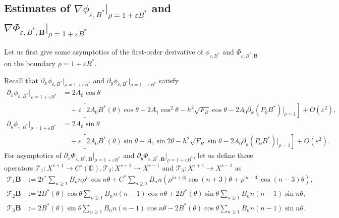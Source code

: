 \documentclass[12pt,reqno]{amsart}
\numberwithin{equation}{section}
\theoremstyle{definition}
\theoremstyle{remark}
\begin{document}
\subsection{Estimates of $  \nabla\phi_{\varepsilon,B^*}\big|_{\rho=1+\varepsilon B^*} $  and  $\nabla\Phi_{\varepsilon, B^*,\textbf{B}}\big|_{\rho=1+\varepsilon B^*} $}

Let us first give some asymptotics of the first-order derivative of $  \phi_{\varepsilon,B^*} $  and  $\Phi_{\varepsilon, B^*,\textbf{B}} $ on the boundary $ \rho=1+\varepsilon B^*. $  



Recall that $  \partial_{x}\phi_{\varepsilon,B^*}\big|_{\rho=1+\varepsilon B^*} $ and $  \partial_{y}\phi_{\varepsilon,B^*}\big|_{\rho=1+\varepsilon B^*} $ satisfy
\begin{equation}\label{eq:pxpy-phi}
\begin{split}
\partial_x\phi_{\varepsilon,B^*}\big|_{\rho=1+\varepsilon B^*}&=2A_0 \cos\theta\\
&\quad+\varepsilon\left[2A_0  B^*(\theta)\cos\theta+2A_1\cos^2\theta-h^2\sqrt{F_R}\cos\theta-2A_0\partial_x(P_{0}B^*)|_{\rho=1 }\right]+O(\varepsilon^2),\\
\partial_y\phi_{\varepsilon,B^*}\big|_{\rho=1+\varepsilon B^*}&=2A_0 \sin\theta\\
&\quad+\varepsilon\left[2A_0  B^*(\theta)\sin\theta+A_1\sin2\theta-h^2\sqrt{F_R}\sin\theta-2A_0\partial_y(P_{0}B^*)|_{\rho=1}\right]+O(\varepsilon^2).
\end{split}
\end{equation}
For asymptotics of $\partial_{x}\Phi_{\varepsilon, B^*,\textbf{B}}\big|_{\rho=1+\varepsilon B^*} $ and $\partial_{y}\Phi_{\varepsilon, B^*,\textbf{B}}\big|_{\rho=1+\varepsilon B^*} $, let us   define three operators $ \mathcal{T}_1:X^{s+1}\to C^{s}(\mathbb{D}), \mathcal{T}_2:X^{s+1}\to X^{s-1}  $ and $ \mathcal{T}_3:X^{s+1}\to X^{s-1} $ as 
\begin{align*}
\mathcal{T}_1 \textbf{B}
&:=2t^*\sum_{n\ge1}B_nn\rho^{n}\cos n\theta
+ C^* \sum_{n\ge1}B_nn\left(\rho^{|n+3|}\cos(n+3)\theta+\rho^{|n-3|}\cos(n-3)\theta\right),\\
\mathcal{T}_2 \textbf{B}
&:=2B^*(\theta)\cos\theta\sum_{n\ge1}B_nn(n-1) \cos n\theta +2B^*(\theta) \sin\theta\sum_{n\ge1}B_nn(n-1) \sin n\theta,\\
\mathcal{T}_3 \textbf{B}
&:= 
2B^*(\theta)\sin\theta\sum_{n\ge1}B_nn(n-1)  \cos n\theta  -2B^*(\theta)\cos\theta\sum_{n\ge1}B_nn(n-1)  \sin n\theta.  
\end{align*}
\end{document}
